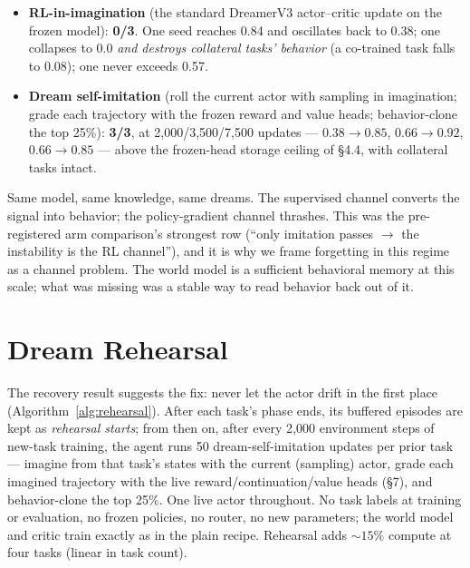 \documentclass[10pt]{article}
\providecommand{\tightlist}{\setlength{\itemsep}{0pt}\setlength{\parskip}{0pt}}
\begin{document}
\begin{itemize}\tightlist
\item \textbf{RL-in-imagination} (the standard DreamerV3 actor--critic update on the frozen
model): \textbf{0/3}. One seed reaches 0.84 and oscillates back to 0.38; one collapses to
0.0 \emph{and destroys collateral tasks' behavior} (a co-trained task falls to 0.08); one
never exceeds 0.57.
\item \textbf{Dream self-imitation} (roll the current actor with sampling in imagination;
grade each trajectory with the frozen reward and value heads; behavior-clone the top 25\%):
\textbf{3/3}, at 2{,}000/3{,}500/7{,}500 updates --- $0.38{\rightarrow}0.85$,
$0.66{\rightarrow}0.92$, $0.66{\rightarrow}0.85$ --- above the frozen-head storage ceiling
of \S4.4, with collateral tasks intact.
\end{itemize}

Same model, same knowledge, same dreams. The supervised channel converts the signal into
behavior; the policy-gradient channel thrashes. This was the pre-registered arm comparison's
strongest row (``only imitation passes $\rightarrow$ the instability is the RL channel''),
and it is why we frame forgetting in this regime as a channel problem. The world model is a
sufficient behavioral memory at this scale; what was missing was a stable way to read
behavior back out of it.

\section{Dream Rehearsal}

The recovery result suggests the fix: never let the actor drift in the first place
(Algorithm~\ref{alg:rehearsal}). After each task's phase ends, its buffered episodes are
kept as \emph{rehearsal starts}; from then on, after every 2{,}000 environment steps of
new-task training, the agent runs 50 dream-self-imitation updates per prior task ---
imagine from that task's states with the current (sampling) actor, grade each imagined
trajectory with the live reward/continuation/value heads (\S7), and behavior-clone the top
25\%. One live actor throughout. No task labels at training or evaluation, no frozen
policies, no router, no new parameters; the world model and critic train exactly as in the
plain recipe. Rehearsal adds ${\sim}15\%$ compute at four tasks (linear in task count).
\end{document}
